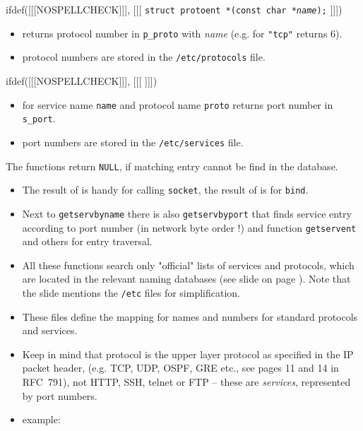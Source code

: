 \begin{slide}
ifdef([[[NOSPELLCHECK]]], [[[
\texttt{struct protoent *(const char *\emph{name});}
]]])
\begin{itemize}
\item returns protocol number in \texttt{p\_proto} with \emph{name}
(e.g. for \texttt{"tcp"} returns 6).
\item protocol numbers are stored in the \texttt{/etc/protocols} file.
\end{itemize}
ifdef([[[NOSPELLCHECK]]], [[[
]]])
\begin{itemize}
\item for service name \texttt{name} and protocol name \texttt{proto}
returns port number in \texttt{s\_port}.
\item port numbers are stored in the \texttt{/etc/services} file.
\end{itemize}

The functions return \texttt{NULL}, if matching entry cannot be find in the
database.
\end{slide}

\begin{itemize}
\item The result of  is handy for calling \texttt{socket},
the result of  is for \texttt{bind}.
\item Next to \texttt{getservbyname} there is also \texttt{getservbyport}
that finds service entry according to port number (in network byte order !)
and function \texttt{getservent} and others for entry traversal.
\item All these functions search only "official" lists of services and
protocols, which are located in the relevant naming databases (see slide on
page \pageref{name_service_switch}). Note that the slide mentions the
\texttt{/etc} files for simplification.
\item These files define the mapping for names and numbers for standard
protocols and services.
\item Keep in mind that protocol is the upper layer protocol as specified in
the IP packet header, (e.g. TCP, UDP, OSPF, GRE etc., see pages 11 and 14 in
RFC~791), not HTTP, SSH, telnet or FTP -- these are \emph{services}, represented
by port numbers.
\item {} example: 
\end{itemize}

